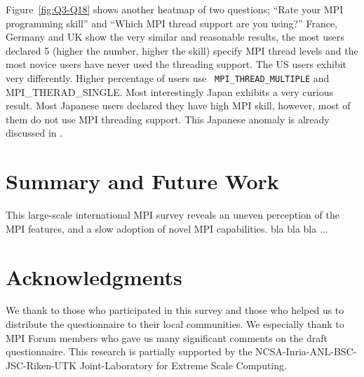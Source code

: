 \documentclass[sigconf,nonacm]{acmart}
\begin{document}
Figure~\ref{fig:Q3-Q18} shows another heatmap of two questions;
``Rate your MPI programming skill'' and ``Which MPI thread support are
you using?'' France, Germany and UK show the very similar and
reasonable results, the most users declared 5 (higher the number,
higher the skill) specify MPI thread levels and the most novice users
have never used the threading support. The US users exhibit very
differently. Higher percentage of users use {\tt
  MPI\_THREAD\_MULTIPLE} and {MPI\_THERAD\_SINGLE}. Most
interestingly Japan exhibits a very curious result. Most Japanese
users declared they have high MPI skill, however, most of them do not
use MPI threading support. This Japanese anomaly is already discussed
in \cite{swopp2019}.


\section{Summary and Future Work}

This large-scale international MPI survey reveals an uneven perception of the
MPI features, and a slow adoption of novel MPI capabilities. bla bla
bla ...
%

\section*{Acknowledgments}
We thank to those who participated in this survey and those who
helped us to distribute the questionnaire to their local
communities. We especially thank to MPI Forum members who gave us many
significant comments on the draft questionnaire.
This research is partially supported by the
NCSA-Inria-ANL-BSC-JSC-Riken-UTK Joint-Laboratory for Extreme Scale
Computing\cite{JLESC}.



\end{document}
